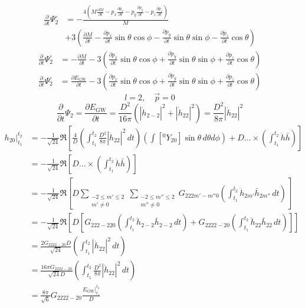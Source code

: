 \documentclass[a3paper]{ctexart}
\begin{document}
\begin{align*}
    \frac{\partial}{\partial t}\Psi_2^\circ&=
    -\frac{4
    (M\frac{\partial M}{\partial t}-p_x\frac{\partial p_x}{\partial t}-p_y\frac{\partial p_y}{\partial t}-p_z\frac{\partial p_z}{\partial t})}
    {M}\\
    &+3(\frac{\partial M}{\partial t}-\frac{\partial p_x}{\partial t}\sin\theta\cos\phi-\frac{\partial p_y}{\partial t}\sin\theta\sin\phi-\frac{\partial p_z}{\partial t}\cos\theta)
\end{align*}
\begin{align*}
    \frac{\partial}{\partial t}\Psi_2^\circ&=-\frac{\partial M}{\partial t}
    -3(\frac{\partial p_x}{\partial t}\sin\theta\cos\phi+\frac{\partial p_y}{\partial t}\sin\theta\sin\phi+\frac{\partial p_z}{\partial t}\cos\theta)
\end{align*}
\begin{align*}
    \frac{\partial}{\partial t}\Psi_2^\circ&=\frac{\partial E_\text{GW}}{\partial t}
    -3(\frac{\partial p_x}{\partial t}\sin\theta\cos\phi+\frac{\partial p_y}{\partial t}\sin\theta\sin\phi+\frac{\partial p_z}{\partial t}\cos\theta)
\end{align*}
\begin{equation*}
    l=2,\quad\vec{p}=0
\end{equation*}
\begin{equation*}
    \frac{\partial}{\partial t}\Psi_2=\frac{\partial E_\text{GW}}{\partial t}=\frac{D^2}{16\pi}(\left\lvert\dot{h}_{2-2}\right\rvert^2+\left\lvert\dot{h}_{22}\right\rvert^2)=\frac{D^2}{8\pi}\left\lvert\dot{h}_{22}\right\rvert^2
\end{equation*}
\begin{align*}
    h_{20}\vert_{t_1}^{t_2}&=-\frac{1}{\sqrt{24}}\Re\left[
        \frac{4}{D}\left(\int_{t_1}^{t_2}\frac{D^2}{8\pi}\left\lvert\dot{h}_{22}\right\rvert^2\,dt\right)
        \left(\int[{}^0Y_{20}]\sin\theta\,d\theta d\phi\right)
        +D\dots\times\left(\int_{t_1}^{t_2}\ddot{h}\bar{h}\right)
    \right]\\
    &=-\frac{1}{\sqrt{24}}\Re\left[
        D\dots\times\left(\int_{t_1}^{t_2}\ddot{h}\bar{h}\right)
    \right]\\
    &=-\frac{1}{\sqrt{24}}\Re\left[
        D\sum_{\substack{-2\le{m'}\le{2}\\m'\ne0}}\sum_{\substack{-2\le{m''}\le{2}\\m''\ne0}}
        G_{222m'-m''0}\left(\int_{t_1}^{t_2}\ddot{h}_{2m'}\bar{h}_{2m''}\,dt\right)
    \right]\\
    &=-\frac{1}{\sqrt{24}}\Re\left[D
        [G_{222-220}\left(\int_{t_1}^{t_2}\ddot{h}_{2-2}\bar{h}_{2-2}\,dt\right)
        +G_{2222-20}\left(\int_{t_1}^{t_2}\ddot{h}_{22}\bar{h}_{22}\,dt\right)]
    \right]\\
    &=\frac{2G_{2222-20}D}{\sqrt{24}}
    \left(\int_{t_1}^{t_2}\left\lvert\dot{h}_{22}\right\rvert^2\,dt\right)\\
    &=\frac{16\pi G_{2222-20}}{\sqrt{24}D}
    \left(\int_{t_1}^{t_2}\frac{D^2}{8\pi}\left\lvert\dot{h}_{22}\right\rvert^2\,dt\right)\\
    &=\frac{8\pi }{\sqrt{6}}G_{2222-20}\frac{E_\text{GW}\vert_{t_1}^{t_2}}{D}
\end{align*}
\end{document}
